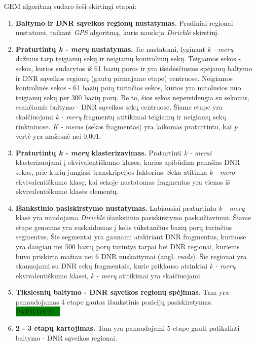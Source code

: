 \documentclass[12pt]{article}
\begin{document}
GEM algoritmą sudaro šeši skirtingi etapai\cite{ARTICLE15}:
\begin{enumerate}
    \item \textbf{Baltymo ir DNR sąveikos regionų nustatymas.} Pradiniai
          regionai nustatomi, taikant \emph{GPS} algoritmą\cite{ARTICLE14},
          kuris naudoja \emph{Dirichlė} skirstinį.
    \item \textbf{Praturtintų \emph{k - merų} nustatymas.} Jie nustatomi,
          lyginant \emph{k - merų} dažnius tarp teigiamų sekų ir neigiamų
          kontrolinių sekų. Teigiamos sekos - sekos, kurios sudarytos iš 61
          bazių poros ir yra išsidėsčiusios spėjamų baltymo ir DNR sąveikos
          regionų (gautų pirmajame etape) centruose. Neigiamos kontrolinės
          sekos - 61 bazių porą turinčios sekos, kurios yra nutolusios nuo
          teigiamų sekų per 300 bazių porų. Be to, šios sekos nepersidengia su
          sekomis, esančiomis baltymo - DNR sąveikos sekų centruose. Šiame
          etape yra skaičiuojami \emph{k - merų} fragmentų atitikimai teigiamų
          ir neigiamų sekų rinkiniuose. \emph{K - meras} (sekos fragmentas)
          yra laikomas praturtintu, kai \emph{p} vertė yra mažesnė nei 0.001.
    \item \textbf{Praturtintų \emph{k - merų} klasterizavimas.} Praturtinti
          \emph{k - merai} klasterizuojami į ekvivalentiškumo klases, kurios
          apibūdina panašias DNR sekas, prie kurių jungiasi transkripcijos
          faktorius. Seka atitinka \emph{k - mero} ekvivalentiškumo klasę, kai
          sekoje nustatomas fragmentas yra vienas iš ekvivalentiškumo klasės
          elementų.
    \item \textbf{Išankstinio pasiskirstymo nustatymas.} Labiausiai praturtinta
          \emph{k - merų} klasė yra naudojama \emph{Dirichlė} išankstinio
          pasiskirstymo paskaičiavimui. Šiame etape genomas yra suskaidomas į
          kelis tūkstančius bazių porų turinčius segmentus. Šie segmentai yra
          gaunami atskiriant DNR fragmentus, kuriuose yra daugiau nei 500 bazių
          porų turintys tarpai bei DNR regionai, kuriems buvo priskirta mažiau
          nei 6 DNR nuskaitymai (angl. \emph{reads}). Šie regionai yra
          skanuojami su DNR sekų fragmentais, kurie priklauso atrinktai
          \emph{k - merų} ekvivalentiškumo klasei, \emph{k - merų}
          atitikimai yra skaičiuojami.
    \item \textbf{Tikslesnių baltymo - DNR sąveikos regionų spėjimas.} Tam yra
          panaudojamas 4 etape gautas išankstinis pozicijų pasiskirstymas.
          \colorbox{green}{PAPILDYTI...}
    \item \textbf{2 - 3 etapų kartojimas.} Tam yra panaudojami 5 etape gauti
          patikslinti baltymo - DNR sąveikos regionai.
\end{enumerate}
\end{document}
